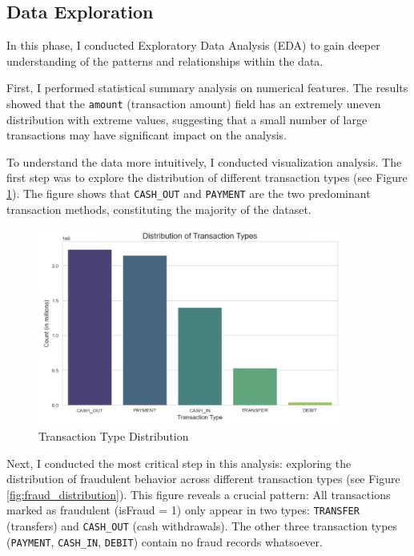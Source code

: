 \documentclass[sigplan,screen]{acmart}
\begin{document}
\subsection{Data Exploration}

In this phase, I conducted Exploratory Data Analysis (EDA) to gain deeper understanding of the patterns and relationships within the data.

First, I performed statistical summary analysis on numerical features. The results showed that the \texttt{amount} (transaction amount) field has an extremely uneven distribution with extreme values, suggesting that a small number of large transactions may have significant impact on the analysis.

To understand the data more intuitively, I conducted visualization analysis. The first step was to explore the distribution of different transaction types (see Figure \ref{fig:transaction_types}). The figure shows that \texttt{CASH\_OUT} and \texttt{PAYMENT} are the two predominant transaction methods, constituting the majority of the dataset.

\begin{figure}[h!]
    \centering
    \includegraphics[width=0.9\textwidth]{2.3.1.png}
    \caption{Transaction Type Distribution}
    \label{fig:transaction_types}
\end{figure}

Next, I conducted the most critical step in this analysis: exploring the distribution of fraudulent behavior across different transaction types (see Figure \ref{fig:fraud_distribution}). This figure reveals a crucial pattern: All transactions marked as fraudulent (isFraud = 1) only appear in two types: \texttt{TRANSFER} (transfers) and \texttt{CASH\_OUT} (cash withdrawals). The other three transaction types (\texttt{PAYMENT}, \texttt{CASH\_IN}, \texttt{DEBIT}) contain no fraud records whatsoever.
\end{document}

